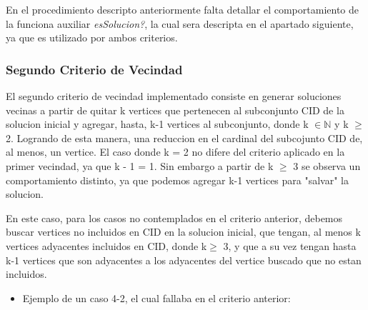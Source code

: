 En el procedimiento descripto anteriormente falta detallar el comportamiento de la funciona auxiliar \textit{esSolucion?}, la cual sera descripta en el apartado siguiente, ya que es utilizado por ambos criterios.

\subsubsection{Segundo Criterio de Vecindad}
El segundo criterio de vecindad implementado consiste en generar soluciones vecinas a partir de quitar k vertices que pertenecen al subconjunto CID de la solucion inicial y agregar, hasta, k-1 vertices al subconjunto, donde k $\in \mathbb{N}$ y k $\geq$ 2. Logrando de esta manera, una reduccion en el cardinal del subcojunto CID de, al menos, un vertice.
El caso donde k = 2 no difere del criterio aplicado en la primer vecindad, ya que k - 1 = 1. Sin embargo a partir de k $\geq$ 3 se observa un comportamiento distinto, ya que podemos agregar k-1 vertices para "salvar" la solucion.

En este caso, para los casos no contemplados en el criterio anterior, debemos buscar vertices no incluidos en CID en la solucion inicial, que tengan, al menos k vertices adyacentes incluidos en CID, donde k$\geq$ 3, y que a su vez tengan hasta k-1 vertices que son adyacentes a los adyacentes del vertice buscado que no estan incluidos.

\begin{itemize}
	\item Ejemplo de un caso 4-2, el cual fallaba en el criterio anterior:


\end{itemize}

